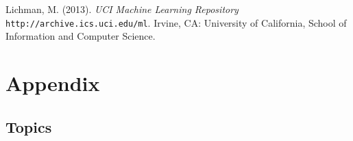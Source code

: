 \documentclass[final]{ieee}
\begin{document}
\begin{thebibliography}{99}


 Lichman, M. (2013). {\it UCI Machine Learning Repository} \texttt{http://archive.ics.uci.edu/ml}. Irvine, CA: University of California, School of Information and Computer Science.



\end{thebibliography}

\newpage

\hbox{}


\newpage

\thispagestyle{empty}

\section*{Appendix}

\subsection*{Topics}

\end{document}
